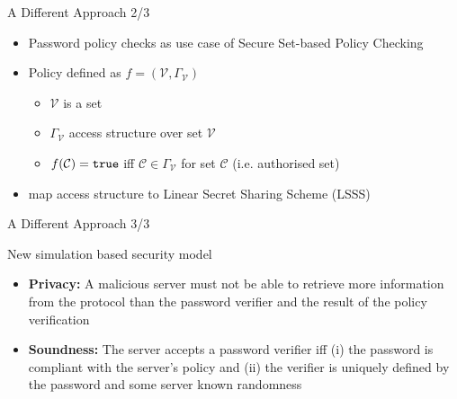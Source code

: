 \documentclass[notes,xcolor=dvipsnames]{beamer}
\begin{document}
\begin{frame}{A Different Approach 2/3}
  \begin{itemize}
    \item Password policy checks as use case of Secure Set-based Policy Checking
    \item Policy defined as $f=(\mathcal{V}, \Gamma_\mathcal{V})$
    \begin{itemize}
      \item $\mathcal{V}$ is a set
      \item $\Gamma_\mathcal{V}$ access structure over set $\mathcal{V}$
      \item $f(\mathcal{C})=\mathtt{true}$ iff $\mathcal{C}\in\Gamma_\mathcal{V}$ for set $\mathcal{C}$ (i.e. authorised set)
    \end{itemize}
    \item map access structure to \alert{Linear Secret Sharing Scheme (LSSS)}
  \end{itemize}
  
\end{frame}

\begin{frame}{A Different Approach 3/3}

   New simulation based security model
  \begin{itemize}
      \item \textbf{Privacy:} A malicious server must not be able to retrieve more information from the protocol than the password verifier and the result of the policy verification
      \item \textbf{Soundness:} The server accepts a password verifier iff (i) the password is compliant with the server's policy and (ii) the verifier is uniquely defined by the password and some server known randomness
  \end{itemize}
\end{frame}
\end{document}
